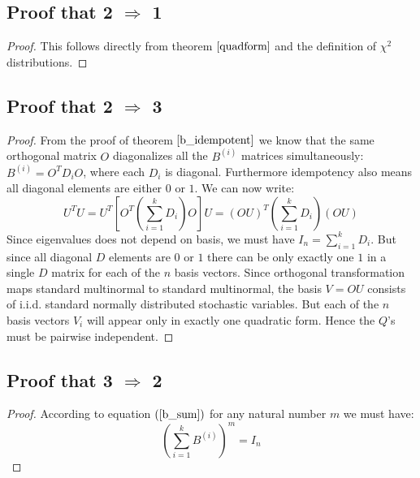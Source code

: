 \documentclass[12pt, a4paper]{article}
\begin{document}
\subsection{Proof that 2 $\Rightarrow$ 1}
\begin{proof}
This follows directly from theorem $\ref{quadform}$ and the definition of $\chi^2$ distributions.
\end{proof}

\subsection{Proof that 2 $\Rightarrow$ 3}
\begin{proof}
From the proof of theorem $\ref{b_idempotent}$ we know that the same orthogonal matrix $O$ diagonalizes all the $B^{(i)}$ matrices simultaneously: $B^{(i)}=O^T D_i O$, where each $D_i$ is diagonal. Furthermore idempotency also means all diagonal elements are either $0$ or $1$. We can now write:
\begin{equation}
U^TU=U^T\left[O^T\left(\sum_{i=1}^k D_i\right)O\right]U=(OU)^T\left(\sum_{i=1}^k D_i\right)(OU)
\end{equation}
Since eigenvalues does not depend on basis, we must have $I_n=\sum_{i=1}^k D_i$. But since all diagonal $D$ elements are $0$ or $1$ there can be only exactly one $1$ in a single $D$ matrix for each of the $n$ basis vectors. Since orthogonal transformation maps standard multinormal to standard multinormal, the basis $V=OU$ consists of i.i.d. standard normally distributed stochastic variables. But each of the $n$ basis vectors $V_i$ will appear only in exactly one quadratic form. Hence the $Q$'s must be pairwise independent.
\end{proof}

\subsection{Proof that 3 $\Rightarrow$ 2}
\begin{proof}
According to equation $(\ref{b_sum})$ for any natural number $m$ we must have:
\begin{equation}
\left(\sum_{i=1}^k B^{(i)}\right)^m=I_n
\end{equation}
\end{proof}
\end{document}
